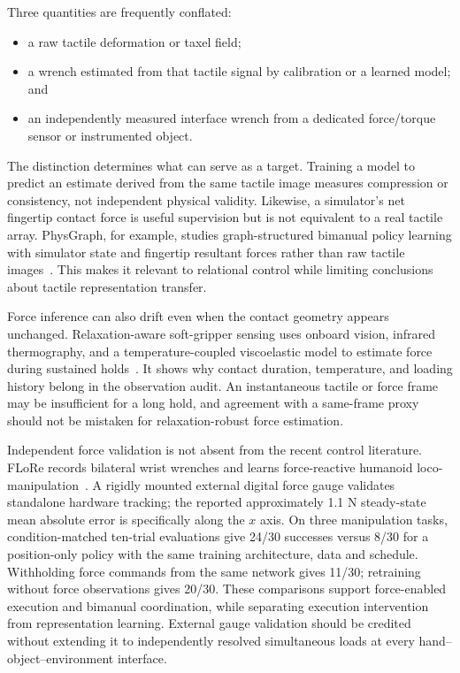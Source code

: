 Three quantities are frequently conflated:

\begin{itemize}
  \item a raw tactile deformation or taxel field;
  \item a wrench estimated from that tactile signal by calibration or a learned
  model; and
  \item an independently measured interface wrench from a dedicated force/torque
  sensor or instrumented object.
\end{itemize}

The distinction determines what can serve as a target. Training a model to predict
an estimate derived from the same tactile image measures compression or
consistency, not independent physical validity. Likewise, a simulator's net
fingertip contact force is useful supervision but is not equivalent to a real
tactile array. PhysGraph, for example, studies graph-structured bimanual policy
learning with simulator state and fingertip resultant forces rather than raw
tactile images~\cite{li2026physgraph}. This makes it relevant to relational control
while limiting conclusions about tactile representation transfer.

Force inference can also drift even when the contact geometry appears unchanged.
Relaxation-aware soft-gripper sensing uses onboard vision, infrared thermography,
and a temperature-coupled viscoelastic model to estimate force during sustained
holds~\cite{wang2026relaxation}. It shows why contact duration, temperature, and
loading history belong in the observation audit. An instantaneous tactile or
force frame may be insufficient for a long hold, and agreement with a same-frame
proxy should not be mistaken for relaxation-robust force estimation.

Independent force validation is not absent from the recent control literature.
FLoRe records bilateral wrist wrenches and learns force-reactive humanoid
loco-manipulation~\cite{update2026flore}. A rigidly mounted external digital
force gauge validates standalone hardware tracking; the reported approximately
1.1 N steady-state mean absolute error is specifically along the $x$ axis.
On three manipulation tasks, condition-matched ten-trial evaluations give
24/30 successes versus 8/30 for a position-only policy with the same training
architecture, data and schedule. Withholding force commands from the same
network gives 11/30; retraining without force observations gives 20/30.
These comparisons support force-enabled execution and bimanual coordination,
while separating execution intervention from representation learning. External
gauge validation should be credited without extending it to independently
resolved simultaneous loads at every hand--object--environment interface.

